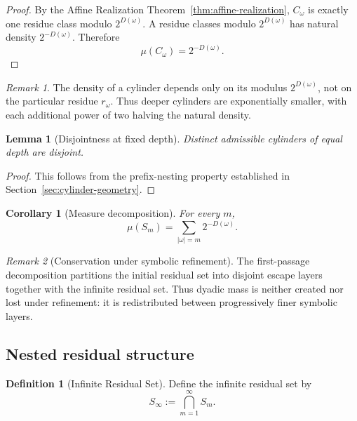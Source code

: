 \documentclass[12pt, oneside]{article}
\numberwithin{equation}{section}
\theoremstyle{definition}
\newtheorem{definition}{Definition}[section]
\theoremstyle{plain}
\newtheorem{lemma}[theorem]{Lemma}
\newtheorem{corollary}[theorem]{Corollary}
\theoremstyle{remark}
\newtheorem*{remark}{Remark}
\begin{document}
\begin{proof}
By the Affine Realization Theorem~\ref{thm:affine-realization},
\(C_\omega\) is exactly one residue class modulo \(2^{D(\omega)}\).
A residue classes modulo \(2^{D(\omega)}\) has natural density
\(2^{-D(\omega)}\). Therefore
\[
\mu(C_\omega)=2^{-D(\omega)}.
\]
\end{proof}

\begin{remark}
The density of a cylinder depends only on its modulus \(2^{D(\omega)}\),
not on the particular residue \(r_\omega\). Thus deeper cylinders are
exponentially smaller, with each additional power of two halving the
natural density.
\end{remark}

\begin{lemma}[Disjointness at fixed depth]
Distinct admissible cylinders of equal depth are disjoint.
\end{lemma}

\begin{proof}
This follows from the prefix-nesting property established in
Section~\ref{sec:cylinder-geometry}.
\end{proof}

\begin{corollary}[Measure decomposition]
\label{cor:measure-decomposition}
For every \(m\),
\[
\mu(S_m) = \sum_{|\omega|=m}2^{-D(\omega)}.
\]
\end{corollary}

\begin{remark}[Conservation under symbolic refinement]
The first-passage decomposition partitions the initial residual set
into disjoint escape layers together with the infinite residual set.
Thus dyadic mass is neither created nor lost under refinement:
it is redistributed between progressively finer symbolic layers.
\end{remark}

\subsection{Nested residual structure}

\begin{definition}[Infinite Residual Set]
Define the infinite residual set by
\[
S_\infty := \bigcap_{m=1}^{\infty} S_m.
\]
\end{definition}
\end{document}
